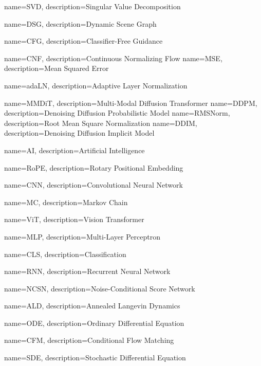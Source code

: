 {
	name=SVD,
	description={Singular Value Decomposition}
}

{
	name=DSG,
	description={Dynamic Scene Graph}
}

{
	name=CFG,
	description={Classifier-Free Guidance}
}

{
	name=CNF,
	description={Continuous Normalizing Flow}
}
{
	name=MSE,
	description={Mean Squared Error}
}

{
	name=adaLN,
	description={Adaptive Layer Normalization}
}

{
	name=MMDiT,
	description={Multi-Modal Diffusion Transformer}
}
{
	name=DDPM,
	description={Denoising Diffusion Probabilistic Model}
}
{
	name=RMSNorm,
	description={Root Mean Square Normalization}
}
{
	name=DDIM,
	description={Denoising Diffusion Implicit Model}
}

{
	name=AI,
	description={Artificial Intelligence}
}

{
	name=RoPE,
	description={Rotary Positional Embedding}
}

{
	name=CNN,
	description={Convolutional Neural Network}
}


{
	name=MC,
	description={Markov Chain}
}


{
	name=ViT,
	description={Vision Transformer}
}

{
	name=MLP,
	description={Multi-Layer Perceptron}
}

{
	name=CLS,
	description={Classification}
}

{
	name=RNN,
	description={Recurrent Neural Network}
}


{
	name=NCSN,
	description={Noise-Conditional Score Network}
}

{
	name=ALD,
	description={Annealed Langevin Dynamics}
}

{
	name=ODE,
	description={Ordinary Differential Equation}
}

{
	name=CFM,
	description={Conditional Flow Matching}
}

{
	name=SDE,
	description={Stochastic Differential Equation}
}

